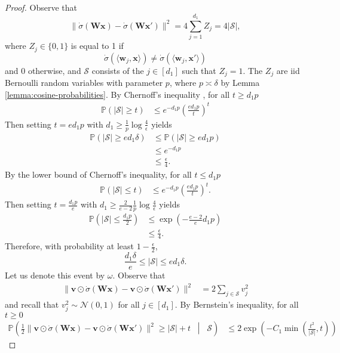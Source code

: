 \documentclass{article}
\theoremstyle{definition}
\renewcommand{\P}{\mathbb{P}}
\newcommand{\mc}{\mathcal}
\def\vv{{\bm{v}}}
\def\vw{{\bm{w}}}
\def\vx{{\bm{x}}}
\def\mW{{\bm{W}}}
\begin{document}
\begin{proof}
    Observe that
    \[\|\dot{\sigma}(\mW \vx) - \dot{\sigma}(\mW \vx')\|^2 = 4\sum_{j = 1}^{d_1} Z_j = 4|\mc{S}|, \]
    where $Z_j \in \{0, 1\}$ is equal to 1 if
    \[\dot{\sigma}(\langle \vw_j, \vx \rangle) \neq \dot{\sigma}(\langle \vw_j, \vx' \rangle) \]
    and 0 otherwise, and $\mc{S}$ consists of the $j \in [d_1]$ such that $Z_j = 1$. The $Z_j$ are iid Bernoulli random variables with parameter $p$, where $p \asymp \delta$ by Lemma \ref{lemma:cosine-probabilities}. By Chernoff's inequality \citep[see][Theorem 2.3.1]{vershynin2018high}, for all $t \geq d_1p$
    \begin{align*}
        \P\left(|\mc{S}| \geq t\right) &\leq e^{-d_1 p}\left(\frac{e d_1p}{t} \right)^t
    \end{align*}
    Then setting $t = ed_1p$ with $d_1 \geq \frac{1}{p}\log \frac{4}{\epsilon}$ yields
    \begin{align*}
        \P\left(|\mc{S}| \geq ed_1 \delta \right) &\leq \P\left(|\mc{S}| \geq ed_1 p \right)\\
        &\leq e^{-d_1p}\\
        &\leq \frac{\epsilon}{4}.
    \end{align*}
    By the lower bound of Chernoff's inequality, for all $t \leq d_1p$
    \begin{align*}
        \P(|\mc{S}| \leq t) &\leq e^{-d_1p }\left(\frac{ed_1 p}{t}\right)^t.
    \end{align*}
    Then setting $t = \frac{d_1p}{e}$ with $d_1 \geq \frac{2}{e - 2} \frac{1}{p} \log \frac{4}{\epsilon}$ yields
    \begin{align*}
        \P\left(|\mc{S}| \leq \frac{d_1p}{2} \right) &\leq \exp\left(-\frac{e - 2}{e}d_1p \right)\\
        &\leq \frac{\epsilon}{4}.
    \end{align*}
    Therefore, with probability at least $ 1- \frac{\epsilon}{2}$,
    \[\frac{d_1\delta}{e}\leq |\mc{S}| \leq ed_1\delta. \]
    Let us denote this event by $\omega$. Observe that
    \begin{align*}
        \|\vv \odot \dot{\sigma}(\mW \vx)  -  \vv \odot \dot{\sigma}(\mW \vx')\|^2 &= 2\sum_{j \in \mc{S}}v_j^2
    \end{align*}
    and recall that $v_j^2 \sim \mc{N}(0, 1)$ for all $j \in [d_1]$. By Bernstein's inequality, for all $t \geq 0$
    \begin{align*}
        \P\left(\frac{1}{2}\|\vv \odot \dot{\sigma}(\mW\vx) - \vv \odot \dot{\sigma}(\mW\vx')\|^2 \geq |\mc{S}| + t \;\; \middle| \;\; \mc{S} \right) &\leq 2\exp\left(-C_1 \min\left(\frac{t^2}{|\mc{S}| }, t \right) \right)

\end{align*}
\end{proof}
\end{document}
